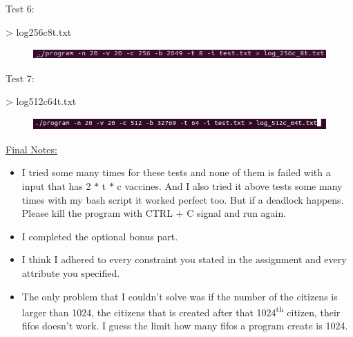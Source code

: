 \documentclass[12pt]{report}
\renewcommand{\_}{\kern-1.5pt\textunderscore\kern-1.5pt}
\begin{document}
\vspace{\baselineskip}
\vspace{\baselineskip}
\begin{justify}
Test 6:
\end{justify}
\begin{justify}
> log\_256c\_8t.txt
\end{justify}


\begin{figure}[H]
	\begin{Center}
		\includegraphics[width=5.0in,height=0.15in]{image6.png}
	\end{Center}
\end{figure}



\vspace{\baselineskip}
\vspace{\baselineskip}
\begin{justify}
Test 7:
\end{justify}
\begin{justify}
> log\_512c\_64t.txt
\end{justify}

\begin{figure}[H]
	\begin{Center}
		\includegraphics[width=5.0in,height=0.18in]{image7.png}
	\end{Center}
\end{figure}



\vspace{\baselineskip}
\vspace{\baselineskip}
\begin{justify}
{\fontsize{16pt}{19.2pt}\selectfont \uline{Final Notes:}}
\end{justify}
\begin{itemize}
	\item I tried some many times for these tests and none of them is failed with a input that has 2 $\ast$  t $\ast$ c vaccines. And I also tried it above tests some many times with my bash script it worked perfect too. But if a deadlock happens. Please kill the program with CTRL + C signal and run again.
	\item I completed the optional bonus part.
\end{itemize}
\begin{itemize}
	\item I think I adhered to every constraint you stated in the assignment and every attribute you specified.
	\item The only problem that I couldn’t solve was if the number of the citizens is larger than 1024, the citizens that is created after that 1024\textsuperscript{th} citizen, their fifos doesn’t work. I guess the limit how many fifos a program create is 1024.
\end{itemize}
\printbibliography
\end{document}
